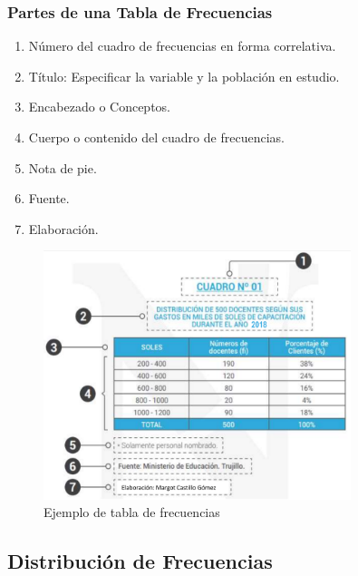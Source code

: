 \documentclass{article}
\begin{document}
        \subsubsection{Partes de una Tabla de Frecuencias}
            \begin{enumerate}[label=\arabic*.]
                \item Número del cuadro de frecuencias en forma correlativa.
                \item Título: Especificar la variable y la población en estudio.
                \item Encabezado o Conceptos.
                \item Cuerpo o contenido del cuadro de frecuencias.
                \item Nota de pie.
                \item Fuente.
                \item Elaboración.
            \end{enumerate}

            \begin{figure}[h!]
                \centering
                \includegraphics[width=0.8\textwidth]{img/tabla_frecuencia.png}
                \caption{Ejemplo de tabla de frecuencias}
            \end{figure}

    \subsection{Distribución de Frecuencias}
\end{document}
